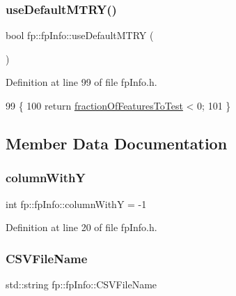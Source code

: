 \subsubsection{\texorpdfstring{use\+Default\+M\+T\+R\+Y()}{useDefaultMTRY()}}
{\footnotesize\ttfamily bool fp\+::fp\+Info\+::use\+Default\+M\+T\+RY (\begin{DoxyParamCaption}{ }\end{DoxyParamCaption})\hspace{0.3cm}{\ttfamily [inline]}}



Definition at line 99 of file fp\+Info.\+h.


\begin{DoxyCode}
99                                         \{
100                 \textcolor{keywordflow}{return} \hyperlink{classfp_1_1fpInfo_ab949cb97523283367e9b120fd78e3c3b}{fractionOfFeaturesToTest} < 0;
101             \}
\end{DoxyCode}


\subsection{Member Data Documentation}
\mbox{\label{classfp_1_1fpInfo_ac29e135cd84cdef547b678e7ea37f92d}} 
\subsubsection{\texorpdfstring{column\+WithY}{columnWithY}}
{\footnotesize\ttfamily int fp\+::fp\+Info\+::column\+WithY = -\/1\hspace{0.3cm}{\ttfamily [protected]}}



Definition at line 20 of file fp\+Info.\+h.

\mbox{\label{classfp_1_1fpInfo_aac01e5ddb27bc333e172a0422066af1c}} 
\subsubsection{\texorpdfstring{C\+S\+V\+File\+Name}{CSVFileName}}
{\footnotesize\ttfamily std\+::string fp\+::fp\+Info\+::\+C\+S\+V\+File\+Name\hspace{0.3cm}{\ttfamily [protected]}}



